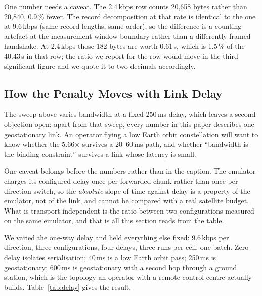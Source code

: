 \documentclass[drones,article,submit,pdftex,moreauthors]{Definitions/mdpi}
\newcommand{\kbps}{kbps}
\begin{document}
One number needs a caveat. The 2.4\,\kbps{} row counts 20{,}658 bytes
rather than 20{,}840, 0.9\,\% fewer. The record decomposition at that
rate is identical to the one at 9.6\,\kbps{} (same record lengths, same
order), so the difference is a counting artefact at the measurement
window boundary rather than a differently framed handshake. At
2.4\,\kbps{} those 182 bytes are worth 0.61\,s, which is 1.5\,\% of
the 40.43\,s in that row; the ratio we report for the row would move in
the third significant figure and we quote it to two decimals
accordingly.

\subsection{How the Penalty Moves with Link Delay}
\label{sec:delay}

The sweep above varies bandwidth at a fixed 250\,ms delay, which leaves
a second objection open: apart from that sweep, every number in this
paper describes one geostationary link. An operator flying a low Earth
orbit constellation will want to know whether the 5.66$\times$ survives
a 20--60\,ms path, and whether ``bandwidth is the binding constraint''
survives a link whose latency is small.

One caveat belongs before the numbers rather than in the caption.
The emulator charges its configured delay once per forwarded chunk rather
than once per direction switch, so the \emph{absolute} slope of time
against delay is a property of the emulator, not of the link, and cannot
be compared with a real satellite budget. What is transport-independent
is the ratio between two configurations measured on the same emulator,
and that is all this section reads from the table.

We varied the one-way delay and held everything else fixed: 9.6\,\kbps{}
per direction, three configurations, four delays, three runs per cell,
one batch. Zero delay isolates serialisation; 40\,ms is a low Earth
orbit pass; 250\,ms is geostationary; 600\,ms is geostationary with a
second hop through a ground station, which is the topology an operator
with a remote control centre actually builds. Table~\ref{tab:delay}
gives the result.
\end{document}
